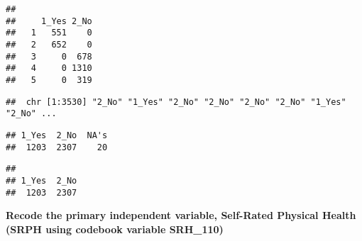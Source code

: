\documentclass[
]{article}
\newenvironment{Shaded}{\begin{snugshade}}{\end{snugshade}}
\newcommand{\CommentTok}[1]{\textcolor[rgb]{0.56,0.35,0.01}{\textit{#1}}}
\newcommand{\ConstantTok}[1]{\textcolor[rgb]{0.56,0.35,0.01}{#1}}
\newcommand{\FunctionTok}[1]{\textcolor[rgb]{0.13,0.29,0.53}{\textbf{#1}}}
\newcommand{\NormalTok}[1]{#1}
\newcommand{\OtherTok}[1]{\textcolor[rgb]{0.56,0.35,0.01}{#1}}
\newcommand{\SpecialCharTok}[1]{\textcolor[rgb]{0.81,0.36,0.00}{\textbf{#1}}}
\begin{document}
\begin{verbatim}
##    
##     1_Yes 2_No
##   1   551    0
##   2   652    0
##   3     0  678
##   4     0 1310
##   5     0  319
\end{verbatim}

\begin{Shaded}
\end{Shaded}

\begin{verbatim}
##  chr [1:3530] "2_No" "1_Yes" "2_No" "2_No" "2_No" "2_No" "1_Yes" "2_No" ...
\end{verbatim}

\begin{Shaded}
\end{Shaded}

\begin{verbatim}
## 1_Yes  2_No  NA's 
##  1203  2307    20
\end{verbatim}

\begin{Shaded}
\end{Shaded}

\begin{verbatim}
## 
## 1_Yes  2_No 
##  1203  2307
\end{verbatim}

\begin{Shaded}
\end{Shaded}

\textbf{Recode the primary independent variable, Self-Rated Physical
Health (SRPH using codebook variable SRH\_110)}
\end{document}
